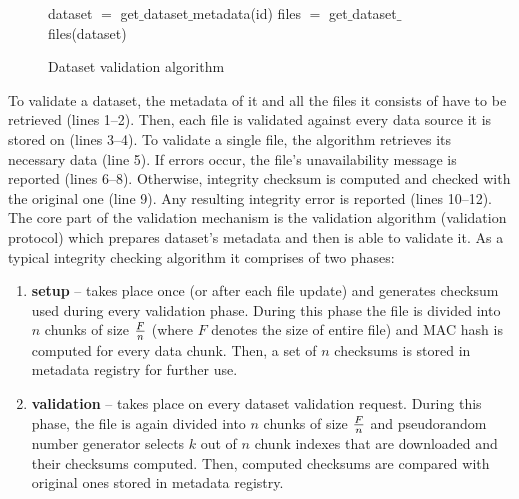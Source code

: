 \begin{figure}
\begin{algorithm}[H]
	\SetLine
	\linesnumbered
	dataset $=$ get$\_$dataset$\_$metadata(id)\;
	files $=$ get$\_$dataset$\_$files(dataset)\;
\caption{Dataset validation algorithm}
\end{algorithm}
\label{fig:algorithm-pseudocode}
\end{figure}

To validate a dataset, the metadata of it and all the files it consists of
have to be retrieved (lines 1--2). Then, each file is validated against every
data source it is stored on (lines 3--4). To validate a single file, the
algorithm retrieves its necessary data (line 5). If errors occur, the file's
unavailability message is reported (lines 6--8). Otherwise, integrity checksum
is computed and checked with the original one (line 9). Any resulting integrity
error is reported (lines 10--12).\\

The core part of the validation mechanism is the validation algorithm
(validation protocol) which prepares dataset's metadata and then is able to
validate it. As a typical integrity checking algorithm it comprises of two 
phases: 

\begin{enumerate}
	\item \textbf{setup} -- takes place once (or after each file update) and 
	generates checksum used during every validation phase. During this
	phase the file is divided into $n$ chunks of size $F \over n$ (where $F$
	denotes the size of entire file) and MAC hash is computed for every data
	chunk. Then, a set of $n$ checksums is stored in metadata registry for
	further use.
	\item \textbf{validation} -- takes place on every dataset validation 
	request. During this phase, the file is again divided into $n$ chunks of size $F \over n$ and
	pseudorandom number generator selects $k$ out of $n$ chunk indexes that are
	downloaded and their checksums computed. Then, computed checksums are
	compared with original ones stored in metadata registry.
\end{enumerate}

